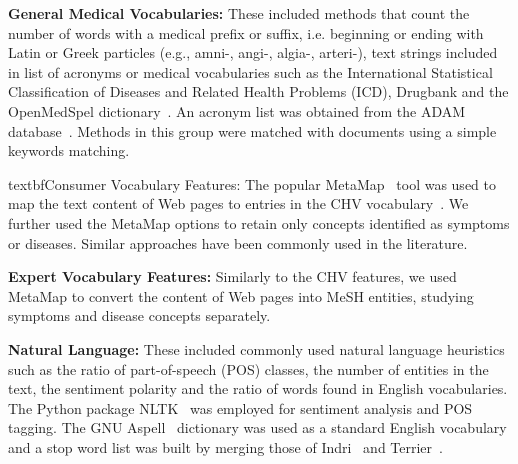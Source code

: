 

\textbf{General Medical Vocabularies:}
These included methods that count the number of words with a medical prefix or suffix, i.e. beginning or ending with Latin or Greek particles (e.g., amni-, angi-, algia-, arteri-), text strings included in list of acronyms or medical vocabularies such as the International Statistical Classification of Diseases and Related Health Problems (ICD), Drugbank and the OpenMedSpel dictionary~\cite{openmedspel}. An acronym list was obtained from the ADAM database~\cite{zhou2006}. Methods in this group were matched with documents using a simple keywords matching.






textbf{Consumer Vocabulary Features:}
The popular MetaMap~\cite{aronson10} tool was used to map the text content of Web pages to entries in the CHV vocabulary~\cite{zeng06}.
We further used the MetaMap options to retain only concepts identified as symptoms or diseases. Similar approaches have been commonly used in the literature\todo{~\cite{}}.



\textbf{Expert Vocabulary Features:}
Similarly to the CHV features, we used MetaMap to convert the content of Web pages into MeSH entities, studying symptoms and disease concepts separately. 



\textbf{Natural Language:}
These included commonly used natural language heuristics such as the ratio of part-of-speech (POS) classes, the number of entities in the text, the sentiment polarity and the ratio of words found in English vocabularies. The Python package NLTK~\cite{nltk} was employed for sentiment analysis and POS tagging. The GNU Aspell~\cite{aspell} dictionary was used as a standard English vocabulary and a stop word list was built by merging those of Indri~\cite{indri} and Terrier~\cite{terrier}. 



